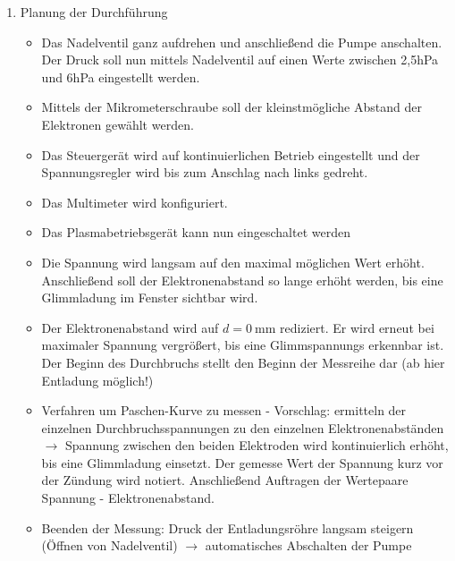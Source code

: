 \documentclass{article}
\begin{document}
\begin{enumerate}[label = (\Roman*)]
    \item Planung der Durchführung
        \begin{itemize}
            \item Das Nadelventil ganz aufdrehen und anschließend die Pumpe anschalten. Der Druck soll nun mittels Nadelventil auf einen Werte zwischen 2,5hPa und 6hPa eingestellt werden.
            \item Mittels der Mikrometerschraube soll der kleinstmögliche Abstand der Elektronen gewählt werden. 
            \item Das Steuergerät wird auf kontinuierlichen Betrieb eingestellt und der Spannungsregler wird bis zum Anschlag nach links gedreht.
            \item Das Multimeter wird konfiguriert.
            \item Das Plasmabetriebsgerät kann nun eingeschaltet werden
            \item Die Spannung wird langsam auf den maximal möglichen Wert erhöht. Anschließend soll der Elektronenabstand so lange erhöht werden, bis eine Glimmladung im Fenster sichtbar wird.
            \item Der Elektronenabstand wird auf $d = \qty{0}{\mm}$ rediziert. Er wird erneut bei maximaler Spannung vergrößert, bis eine Glimmspannungs erkennbar ist. Der Beginn des Durchbruchs stellt den Beginn der Messreihe dar (ab hier Entladung möglich!)
            \item Verfahren um Paschen-Kurve zu messen - Vorschlag: ermitteln der einzelnen Durchbruchsspannungen zu den einzelnen Elektronenabständen $\xrightarrow{}$ Spannung zwischen den beiden Elektroden wird kontinuierlich erhöht, bis eine Glimmladung einsetzt. Der gemesse Wert der Spannung kurz vor der Zündung wird notiert. Anschließend Auftragen der Wertepaare Spannung - Elektronenabstand.
            \item Beenden der Messung: Druck der Entladungsröhre langsam steigern (Öffnen von Nadelventil) $\xrightarrow{}$ automatisches Abschalten der Pumpe
        \end{itemize}


\end{enumerate}
\end{document}
